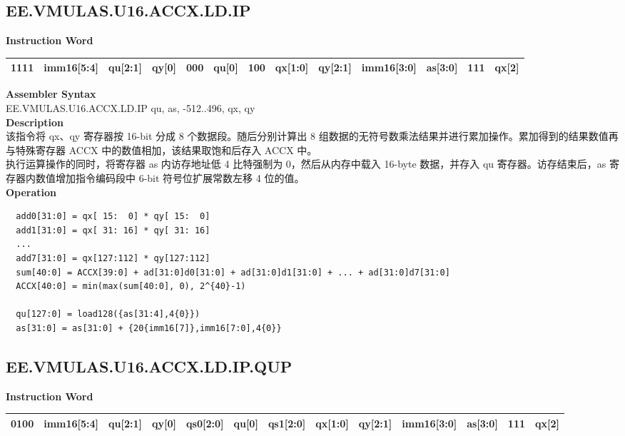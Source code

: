 \clearpage
\subsection{EE.VMULAS.U16.ACCX.LD.IP}\label{instruction:EEVMULASU16ACCXLDIP}
\setlength\tabcolsep{6pt}
\textbf{Instruction Word} \\
\begin{tabular}{|c|c|c|c|c|c|c|c|c|c|c|c|c|}
	\hline
	1111 & imm16[5:4] & qu[2:1] & qy[0] & 000 & qu[0] & 100 & qx[1:0] & qy[2:1] & imm16[3:0] & as[3:0] & 111 & qx[2] \\
	\hline
\end{tabular}

\textbf{Assembler Syntax} \\
EE.VMULAS.U16.ACCX.LD.IP qu, as, -512..496, qx, qy \\
\textbf{Description} \\
该指令将 qx、qy 寄存器按 16-bit 分成 8 个数据段。随后分别计算出 8 组数据的无符号数乘法结果并进行累加操作。累加得到的结果数值再与特殊寄存器 ACCX 中的数值相加，该结果取饱和后存入 ACCX 中。\\ 执行运算操作的同时，将寄存器 as 内访存地址低 4 比特强制为 0，然后从内存中载入 16-byte 数据，并存入 qu 寄存器。访存结束后，as 寄存器内数值增加指令编码段中 6-bit 符号位扩展常数左移 4 位的值。\\
\textbf{Operation}
\begin{lstlisting}
  add0[31:0] = qx[ 15:  0] * qy[ 15:  0]
  add1[31:0] = qx[ 31: 16] * qy[ 31: 16]
  ...
  add7[31:0] = qx[127:112] * qy[127:112]
  sum[40:0] = ACCX[39:0] + ad[31:0]d0[31:0] + ad[31:0]d1[31:0] + ... + ad[31:0]d7[31:0]
  ACCX[40:0] = min(max(sum[40:0], 0), 2^{40}-1)

  qu[127:0] = load128({as[31:4],4{0}})
  as[31:0] = as[31:0] + {20{imm16[7]},imm16[7:0],4{0}}
\end{lstlisting}

\clearpage
\subsection{EE.VMULAS.U16.ACCX.LD.IP.QUP}\label{instruction:EEVMULASU16ACCXLDIPQUP}
\setlength\tabcolsep{5pt}
\textbf{Instruction Word} \\
\begin{tabular}{|c|c|c|c|c|c|c|c|c|c|c|c|c|}
	\hline
	0100 & imm16[5:4] & qu[2:1] & qy[0] & qs0[2:0] & qu[0] & qs1[2:0] & qx[1:0] & qy[2:1] & imm16[3:0] & as[3:0] & 111 & qx[2] \\
	\hline
\end{tabular}

